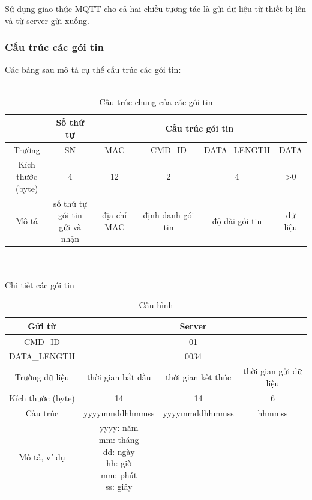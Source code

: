 \documentclass[a4paper,12pt,oneside]{article}
\begin{document}
\noindent Sử dụng giao thức MQTT cho cả hai chiều tương tác là gửi dữ liệu từ thiết bị lên và từ server gửi xuống.
\subsubsection{Cấu trúc các gói tin}
\noindent Các bảng sau mô tả cụ thể cấu trúc các gói tin:\\
\\
\begin{table}[!htp]
\begin{tabular}{|c|c|c|c|c|c|}
\hline 
 & Số thứ tự & \multicolumn{4}{|c|}{Cấu trúc gói tin} \\ 
\hline 
Trường & SN & MAC & CMD\_ID & DATA\_LENGTH  & DATA \\ 
\hline 
\makecell{Kích thước\\ (byte)} & 4 & 12 & 2 & 4 & >0 \\ 
\hline 
Mô tả & \makecell{số thứ tự \\ gói tin\\ gửi và nhận} & địa chỉ MAC & định danh gói tin & độ dài gói tin & dữ liệu \\ 
\hline 
\end{tabular} 
\caption{Cấu trúc chung của các gói tin}
\end{table}
\\
\\
\noindent Chi tiết các gói tin


\begin{table}[!htp]
\centering
\begin{tabular}{|c|c|c|c|}
\hline 
Gửi từ & \multicolumn{3}{c|}{Server} \\ 
\hline 
CMD\_ID & \multicolumn{3}{c|}{01} \\ 
\hline 
DATA\_LENGTH & \multicolumn{3}{c|}{0034} \\ 
\hline 
Trường dữ liệu & thời gian bắt đầu & thời gian kết thúc & thời gian gửi dữ liệu \\ 
\hline 
Kích thước (byte) & 14 & 14 & 6 \\ 
\hline 
Cấu trúc & yyyymmddhhmmss & yyyymmddhhmmss & hhmmss \\ 
\hline 
Mô tả, ví dụ & \makecell{yyyy: năm \\
mm: tháng \\ dd: ngày \\ hh: giờ \\ mm: phút \\ ss: giây} &  &  \\ 
\hline 
\end{tabular} 
\caption{Cấu hình}
\end{table}
\end{document}
